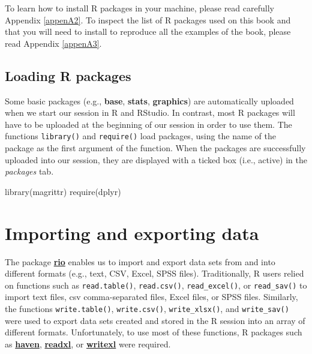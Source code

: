 \documentclass[
]{book}
\newenvironment{Shaded}{\begin{snugshade}}{\end{snugshade}}
\newcommand{\FunctionTok}[1]{\textcolor[rgb]{0.00,0.00,0.00}{#1}}
\newcommand{\NormalTok}[1]{#1}
\theoremstyle{definition}
\theoremstyle{definition}
\theoremstyle{definition}
\theoremstyle{definition}
\theoremstyle{remark}
\begin{document}
To learn how to install R packages in your machine, please read carefully Appendix \ref{appenA2}. To inspect the list of R packages used on this book and that you will need to install to reproduce all the examples of the book, please read Appendix \ref{appenA3}.

\hypertarget{loading-r-packages}{%
\subsection{Loading R packages}\label{loading-r-packages}}

Some basic packages (e.g., \textbf{base}, \textbf{stats}, \textbf{graphics}) are automatically uploaded when we start our session in R and RStudio. In contrast, most R packages will have to be uploaded at the beginning of our session in order to use them. The functions \texttt{library()} and \texttt{require()} load packages, using the name of the package as the first argument of the function. When the packages are successfully uploaded into our session, they are displayed with a ticked box (i.e., active) in the \emph{packages} tab.

\begin{Shaded}
\begin{Highlighting}[]

\FunctionTok{library}\NormalTok{(magrittr)}
\FunctionTok{require}\NormalTok{(dplyr)}
\end{Highlighting}
\end{Shaded}

\hypertarget{importing-and-exporting-data}{%
\section{Importing and exporting data}\label{importing-and-exporting-data}}

The package \href{https://github.com/leeper/rio}{\textbf{rio}} enables us to import and export data sets from and into different formats (e.g., text, CSV, Excel, SPSS files). Traditionally, R users relied on functions such as \texttt{read.table()}, \texttt{read.csv()}, \texttt{read\_excel()}, or \texttt{read\_sav()} to import text files, csv comma-separated files, Excel files, or SPSS files. Similarly, the functions \texttt{write.table()}, \texttt{write.csv()}, \texttt{write\_xlsx()}, and \texttt{write\_sav()} were used to export data sets created and stored in the R session into an array of different formats. Unfortunately, to use most of these functions, R packages such as \href{https://haven.tidyverse.org}{\textbf{haven}}, \href{https://readxl.tidyverse.org}{\textbf{readxl}}, or \href{https://docs.ropensci.org/writexl/}{\textbf{writexl}} were required.
\end{document}
